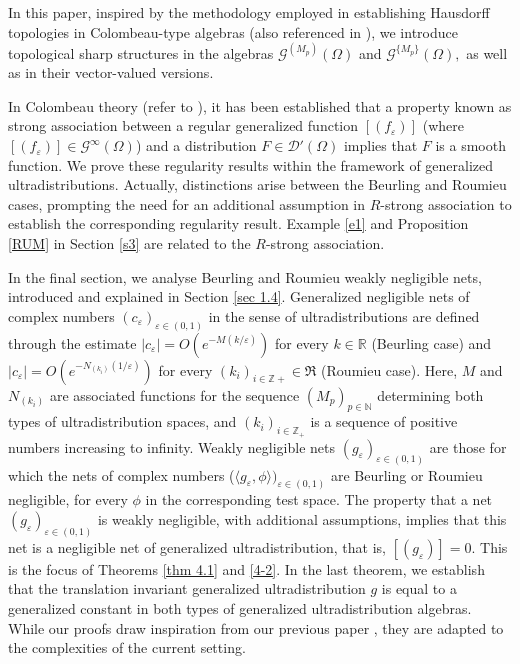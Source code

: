 \documentclass[sn-mathphys,Numbered]{sn-jnl}%
\theoremstyle{thmstyleone}%
\theoremstyle{thmstyletwo}%
\theoremstyle{thmstylethree}%
\begin{document}
In this paper, inspired by the methodology employed in establishing Hausdorff topologies in Colombeau-type algebras \cite{Del-Sca-3,Sca1,Sca3} (also referenced in \cite{ober 001}),  we introduce topological sharp structures in the algebras $\mathcal{G}^{(M_p)} (\Omega)$ and $\mathcal{G}^{\{M_p\}} (\Omega),$ as well as in their vector-valued versions. 

In Colombeau theory (refer to \cite{col1, gkos, her-kunz, Sca1, Sca2, Sca3, Sca4, psv.1}), it has been established that a property known as strong association between a regular generalized function $[(f_\varepsilon)]$ (where $[(f_\varepsilon)] \in \mathcal{G}^{\infty}(\Omega)$) and a distribution $F \in \mathcal{D}'(\Omega)$ implies that $F$ is a smooth function.
We  prove these regularity results within the framework of generalized ultradistributions.  Actually, distinctions arise between the Beurling and Roumieu cases, prompting the need for an additional assumption in $R$-strong association to establish the corresponding regularity result. Example \ref{e1} and Proposition \ref{RUM} in Section \ref{s3} are related to the $R$-strong association. 

In the final section, we analyse Beurling and Roumieu weakly negligible nets, introduced and explained in Section \ref{sec 1.4}. Generalized negligible nets of complex numbers $(c_\varepsilon)_{\varepsilon\in(0,1)}$ in the sense of ultradistributions are defined through the estimate $|c_\varepsilon|=O({e^{-M(k/\varepsilon)}})$ for every $k\in\mathbb R$ (Beurling case) and $|c_\varepsilon|=O({e^{-N_{(k_i)}(1/\varepsilon)}})$ for every $(k_i)_{i\in \mathbb{Z}+}\in\mathfrak R$ (Roumieu case). Here, $M$ and $N_{(k_i)}$ are associated functions for the sequence $(M_p)_{p\in\mathbb{N}}$ determining both types of ultradistribution spaces, and $(k_i)_{i\in\mathbb{Z}_+}$ is a sequence of positive numbers increasing to infinity.  Weakly negligible nets $(g_\varepsilon)_{\varepsilon\in (0,1)}$ are those for which the nets of complex numbers ($\langle g_\varepsilon,\phi\rangle)_{\varepsilon\in(0,1)}$ are Beurling or Roumieu negligible, for  every $\phi$ in the corresponding test space. The property that a net $(g_\varepsilon)_{\varepsilon\in(0,1)}$ is weakly negligible, with additional assumptions, implies that this net is a  negligible net of generalized ultradistribution, that is, $[(g_\varepsilon)]=0$. This is the focus of Theorems \ref{thm 4.1} and \ref{4-2}.  In the last theorem, we establish that the translation invariant generalized ultradistribution $g$ is equal to a generalized constant in both types of generalized ultradistribution algebras.  While our proofs draw inspiration from our previous paper \cite{PSV}, they are adapted to the complexities of the current setting.
\end{document}
